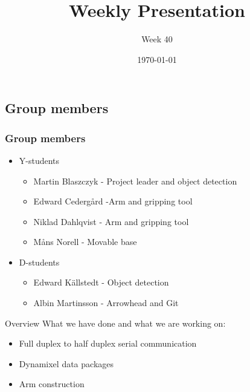\documentclass{beamer}
\title{Weekly Presentation}
\subtitle{Week 40}
\author{}
\institute{Luleå University of Technology}
\date{\today}
\begin{document}
\begin{frame}
    \titlepage
\end{frame}




\begin{frame}
    \subsection{Group members}
    \frametitle{Group members }
    \begin{itemize}
        \item Y-students
        \begin{itemize}
            \item Martin Blaszczyk - Project leader and object detection
            \item Edward Cedergård -Arm and gripping tool
            \item Niklad Dahlqvist -  Arm and gripping tool
            \item Måns Norell - Movable base
        \end{itemize}
        \item D-students
        \begin{itemize}
            \item Edward Källstedt - Object detection
            \item Albin Martinsson - Arrowhead and Git
        \end{itemize}  
    \end{itemize}
\end{frame}




\begin{frame}{Overview}
What we have done and what we are working on:
    \begin{itemize}
        \item Full duplex to half duplex serial communication
        \item Dynamixel data packages
        \item Arm construction
    \end{itemize}
\end{frame}






\end{document}
